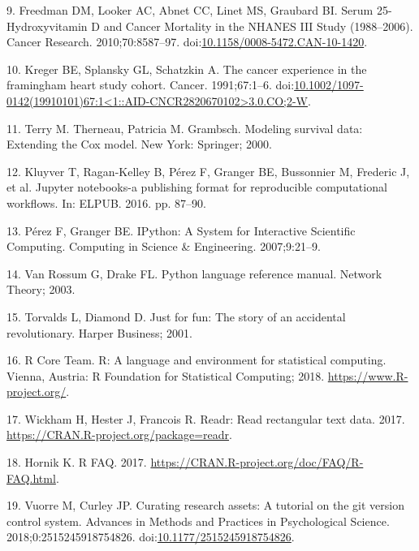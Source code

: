 \documentclass[12pt,oneside]{reedthesis}
\theoremstyle{definition}
\theoremstyle{definition}
\theoremstyle{definition}
\theoremstyle{remark}
\begin{document}
\leavevmode\hypertarget{ref-Freedman_2010}{}%
9. Freedman DM, Looker AC, Abnet CC, Linet MS, Graubard BI. Serum
25-Hydroxyvitamin D and Cancer Mortality in the NHANES III Study
(1988--2006). Cancer Research. 2010;70:8587--97.
doi:\href{https://doi.org/10.1158/0008-5472.CAN-10-1420}{10.1158/0008-5472.CAN-10-1420}.

\leavevmode\hypertarget{ref-Kreger_1991}{}%
10. Kreger BE, Splansky GL, Schatzkin A. The cancer experience in the
framingham heart study cohort. Cancer. 1991;67:1--6.
doi:\href{https://doi.org/10.1002/1097-0142(19910101)67:1\%3C1::AID-CNCR2820670102\%3E3.0.CO;2-W}{10.1002/1097-0142(19910101)67:1\textless{}1::AID-CNCR2820670102\textgreater{}3.0.CO;2-W}.

\leavevmode\hypertarget{ref-Therneau_2000}{}%
11. Terry M. Therneau, Patricia M. Grambsch. Modeling survival data:
Extending the Cox model. New York: Springer; 2000.

\leavevmode\hypertarget{ref-Kluyver_2016}{}%
12. Kluyver T, Ragan-Kelley B, Pérez F, Granger BE, Bussonnier M,
Frederic J, et al. Jupyter notebooks-a publishing format for
reproducible computational workflows. In: ELPUB. 2016. pp. 87--90.

\leavevmode\hypertarget{ref-Perez_2007}{}%
13. Pérez F, Granger BE. IPython: A System for Interactive Scientific
Computing. Computing in Science \& Engineering. 2007;9:21--9.

\leavevmode\hypertarget{ref-python_2003}{}%
14. Van Rossum G, Drake FL. Python language reference manual. Network
Theory; 2003.

\leavevmode\hypertarget{ref-Torvalds_2001}{}%
15. Torvalds L, Diamond D. Just for fun: The story of an accidental
revolutionary. Harper Business; 2001.

\leavevmode\hypertarget{ref-Rcore_2018}{}%
16. R Core Team. R: A language and environment for statistical
computing. Vienna, Austria: R Foundation for Statistical Computing;
2018. \url{https://www.R-project.org/}.

\leavevmode\hypertarget{ref-readr_2017}{}%
17. Wickham H, Hester J, Francois R. Readr: Read rectangular text data.
2017. \url{https://CRAN.R-project.org/package=readr}.

\leavevmode\hypertarget{ref-Hornik_2017}{}%
18. Hornik K. R FAQ. 2017.
\url{https://CRAN.R-project.org/doc/FAQ/R-FAQ.html}.

\leavevmode\hypertarget{ref-Vuorre_2018}{}%
19. Vuorre M, Curley JP. Curating research assets: A tutorial on the git
version control system. Advances in Methods and Practices in
Psychological Science. 2018;0:2515245918754826.
doi:\href{https://doi.org/10.1177/2515245918754826}{10.1177/2515245918754826}.
\end{document}
